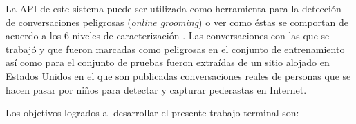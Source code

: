 


La API de este sistema puede ser utilizada como herramienta para la detecci\'on de conversaciones peligrosas (\textit{online grooming}) o ver como \'estas se  comportan de acuerdo a los 6 niveles de  caracterizaci\'on \cite{articulo}. Las conversaciones con las que se trabaj\'o y que  fueron marcadas como peligrosas en el conjunto de entrenamiento as\'i como para el conjunto de pruebas  fueron extra\'idas de un sitio alojado en Estados Unidos en el que son publicadas conversaciones reales de personas que se hacen pasar por ni\~nos para detectar y capturar pederastas en Internet. \cite{perverd}

Los objetivos logrados al desarrollar el presente trabajo terminal son:


